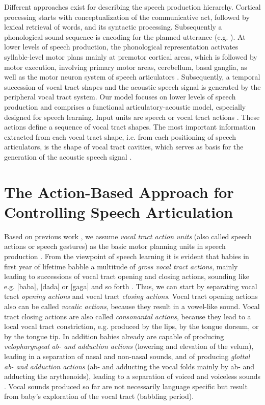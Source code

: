 \documentclass[conference]{IEEEtran}
\begin{document}
Different approaches exist for describing the speech production
hierarchy. Cortical processing starts with conceptualization of the
communicative act, followed by lexical retrieval of words, and its
syntactic processing. Subsequently a phonological sound sequence is
encoding for the planned utterance (e.g. \cite{levelt1999}). At lower
levels of speech production, the phonological representation activates
syllable-level motor plans mainly at premotor cortical areas, which is
followed by motor execution, involving primary motor areas,
cerebellum, basal ganglia, as well as the motor neuron system of
speech articulators \cite{riecker2005}. Subsequently, a temporal
succession of vocal tract shapes and the acoustic speech signal is
generated by the peripheral vocal tract system. Our model focuses on
lower levels of speech production and comprises a functional
articulatory-acoustic model, especially designed for speech learning.
Input units are speech or vocal tract actions
\cite{kroger1993,kroger2010}. These actions define a sequence of vocal
tract shapes. The most important information extracted from each vocal
tract shape, i.e. from each positioning of speech articulators, is the
shape of vocal tract cavities, which serves as basis for the
generation of the acoustic speech signal \cite{kroger1993}.

\section{The Action-Based Approach for Controlling Speech
  Articulation}

Based on previous work \cite{saltzman1989,goldstein2006}, we assume
\textit{vocal tract action units} (also called speech actions or
speech gestures) as the basic motor planning units in speech
production \cite{kroger2010}. From the viewpoint of speech learning it
is evident that babies in first year of lifetime babble a multitude of
\textit{gross vocal tract actions}, mainly leading to successions of
vocal tract opening and closing actions, sounding like e.g. [baba],
[dada] or [gaga] and so forth \cite{kroger2009,kroger2014}. Thus, we
can start by separating vocal tract \textit{opening actions} and vocal
tract \textit{closing actions}. Vocal tract opening actions also can
be called \textit{vocalic actions}, because they result in a
vowel-like sound. Vocal tract closing actions are also called
\textit{consonantal actions}, because they lead to a local vocal tract
constriction, e.g. produced by the lips, by the tongue dorsum, or by
the tongue tip. In addition babies already are capable of producing
\textit{velopharyngeal ab- and adduction actions} (lowering and
elevation of the velum), leading in a separation of nasal and
non-nasal sounds, and of producing \textit{glottal ab- and adduction
  actions} (ab- and adducting the vocal folds mainly by ab- and
adducting the arythenoids), leading to a separation of voiced and
voiceless sounds \cite{kuhl2004}. Vocal sounds produced so far are not
necessarily language specific but result from baby’s exploration of
the vocal tract (babbling period).
\end{document}
